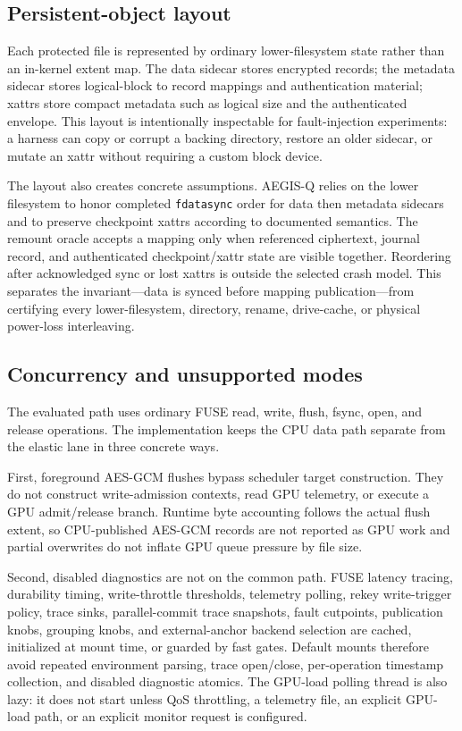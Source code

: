 \subsection{Persistent-object layout}

Each protected file is represented by ordinary lower-filesystem state rather than an in-kernel extent map.  The data sidecar stores encrypted records; the metadata sidecar stores logical-block to record mappings and authentication material; xattrs store compact metadata such as logical size and the authenticated envelope.  This layout is intentionally inspectable for fault-injection experiments: a harness can copy or corrupt a backing directory, restore an older sidecar, or mutate an xattr without requiring a custom block device.

The layout also creates concrete assumptions.  AEGIS-Q relies on the lower filesystem to honor completed \texttt{fdatasync} order for data then metadata sidecars and to preserve checkpoint xattrs according to documented semantics.  The remount oracle accepts a mapping only when referenced ciphertext, journal record, and authenticated checkpoint/xattr state are visible together.  Reordering after acknowledged sync or lost xattrs is outside the selected crash model.  This separates the invariant---data is synced before mapping publication---from certifying every lower-filesystem, directory, rename, drive-cache, or physical power-loss interleaving.

\subsection{Concurrency and unsupported modes}

The evaluated path uses ordinary FUSE read, write, flush, fsync, open, and release operations.  The implementation keeps the CPU data path separate from the elastic lane in three concrete ways.

First, foreground AES-GCM flushes bypass scheduler target construction.  They do not construct write-admission contexts, read GPU telemetry, or execute a GPU admit/release branch.  Runtime byte accounting follows the actual flush extent, so CPU-published AES-GCM records are not reported as GPU work and partial overwrites do not inflate GPU queue pressure by file size.

Second, disabled diagnostics are not on the common path.  FUSE latency tracing, durability timing, write-throttle thresholds, telemetry polling, rekey write-trigger policy, trace sinks, parallel-commit trace snapshots, fault cutpoints, publication knobs, grouping knobs, and external-anchor backend selection are cached, initialized at mount time, or guarded by fast gates.  Default mounts therefore avoid repeated environment parsing, trace open/close, per-operation timestamp collection, and disabled diagnostic atomics.  The GPU-load polling thread is also lazy: it does not start unless QoS throttling, a telemetry file, an explicit GPU-load path, or an explicit monitor request is configured.

